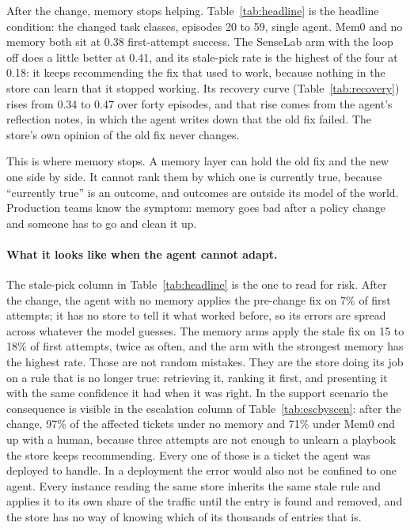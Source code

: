 \documentclass[11pt]{article}
\begin{document}
After the change, memory stops helping. Table~\ref{tab:headline} is the headline condition:
the changed task classes, episodes 20 to 59, single agent. Mem0 and no memory both sit at 0.38
first-attempt success. The SenseLab arm with the loop off does a little better at 0.41, and its
stale-pick rate is the highest of the four at 0.18: it keeps recommending the fix that used to
work, because nothing in the store can learn that it stopped working. Its recovery curve
(Table~\ref{tab:recovery}) rises from 0.34 to 0.47 over forty episodes, and that rise comes
from the agent's reflection notes, in which the agent writes down that the old fix failed. The
store's own opinion of the old fix never changes.

This is where memory stops. A memory layer can hold the old fix and the new one side by side.
It cannot rank them by which one is currently true, because ``currently true'' is an outcome,
and outcomes are outside its model of the world. Production teams know the symptom: memory goes
bad after a policy change and someone has to go and clean it up.

\paragraph{What it looks like when the agent cannot adapt.} The stale-pick column in
Table~\ref{tab:headline} is the one to read for risk. After the change, the agent with no
memory applies the pre-change fix on 7\% of first attempts; it has no store to tell it what
worked before, so its errors are spread across whatever the model guesses. The memory arms
apply the stale fix on 15 to 18\% of first attempts, twice as often, and the arm with the
strongest memory has the highest rate. Those are not random mistakes. They are the store doing
its job on a rule that is no longer true: retrieving it, ranking it first, and presenting it
with the same confidence it had when it was right. In the support scenario the consequence is
visible in the escalation column of Table~\ref{tab:escbyscen}: after the change, 97\% of the
affected tickets under no memory and 71\% under Mem0 end up with a human, because three
attempts are not enough to unlearn a playbook the store keeps recommending. Every one of those
is a ticket the agent was deployed to handle. In a deployment the error would also not be
confined to one agent. Every instance reading the same store inherits the same stale rule and
applies it to its own share of the traffic until the entry is found and removed, and the
store has no way of knowing which of its thousands of entries that is.
\end{document}

